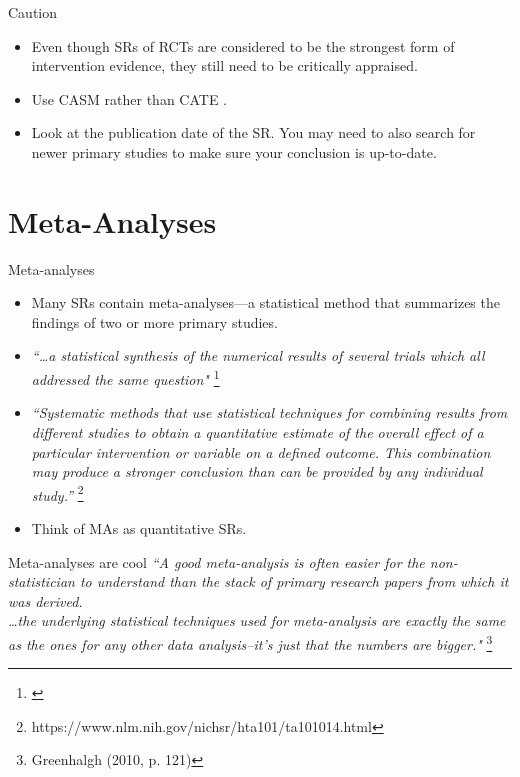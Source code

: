 \documentclass{beamer}
\begin{document}
\begin{frame}{Caution}
	\begin{itemize}
	\item Even though SRs of RCTs are considered to be the strongest form of intervention evidence, \alert{they still need to be critically appraised}.
	\item Use CASM rather than CATE \citep{Dollaghan2007}.
	\item Look at the publication date of the SR. You may need to also search for newer primary studies to make sure your conclusion is up-to-date.	
	\end{itemize}
\end{frame}

\section*{Meta-Analyses}

%
\begin{frame}
\center{\Huge{\textcolor{darkgray}{Meta-Analyses}}}
\end{frame}

% 
\begin{frame}{Meta-analyses}
	\begin{itemize}
	\item Many SRs contain meta-analyses—a statistical method that summarizes the findings of two or more primary studies.
	\item \emph{``\ldots a statistical synthesis of the numerical results of several trials which all addressed the same question"} \footnote{\tiny{\citet[p. 121]{Greenhalgh2010}}}
	\item \emph{``Systematic methods that use statistical techniques for combining results from different studies to obtain a quantitative estimate of the overall effect of a particular intervention or variable on a defined outcome. This combination may produce a stronger conclusion than can be provided by any individual study.''} \footnote{\tiny{https://www.nlm.nih.gov/nichsr/hta101/ta101014.html}}
	\item Think of MAs as quantitative SRs.
	\end{itemize}
\end{frame}

% 
\begin{frame}{Meta-analyses are cool \smiley}
\emph{``A good meta-analysis is often easier for the non-statistician to understand than the stack of primary research papers from which it was derived.
\\
\ldots the underlying statistical techniques used for meta-analysis are exactly the same as the ones for any other data analysis--it's just that the numbers are bigger."} \footnote{\tiny Greenhalgh (2010, p. 121)}
\end{frame}
\end{document}
